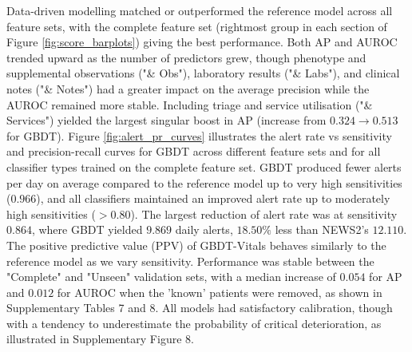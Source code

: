 \documentclass[fleqn,10pt]{wlscirep}
\begin{document}
Data-driven modelling matched or outperformed the reference model across all feature sets, with the complete feature set (rightmost group in each section of Figure \ref{fig:score_barplots}) giving the best performance. Both AP and AUROC trended upward as the number of predictors grew, though phenotype and supplemental observations ("\& Obs"), laboratory results ("\& Labs"), and clinical notes ("\& Notes") had a greater impact on the average precision while the AUROC remained more stable. Including triage and service utilisation ("\& Services") yielded the largest singular boost in AP (increase from $0.324 \rightarrow 0.513$ for GBDT). Figure \ref{fig:alert_pr_curves} illustrates the alert rate vs sensitivity and precision-recall curves for GBDT across different feature sets and for all classifier types trained on the complete feature set. GBDT produced fewer alerts per day on average compared to the reference model up to very high sensitivities ($0.966$), and all classifiers maintained an improved alert rate up to moderately high sensitivities ($>0.80$). The largest reduction of alert rate was at sensitivity $0.864$, where GBDT yielded $9.869$ daily alerts, $18.50\%$ less than NEWS2's $12.110$. The positive predictive value (PPV) of GBDT-Vitals behaves similarly to the reference model as we vary sensitivity. Performance was stable between the "Complete" and "Unseen" validation sets, with a median increase of $0.054$ for AP and $0.012$ for AUROC when the 'known' patients were removed, as shown in Supplementary Tables 7 and 8. All models had satisfactory calibration, though with a tendency to underestimate the probability of critical deterioration, as illustrated in Supplementary Figure 8.
\end{document}
